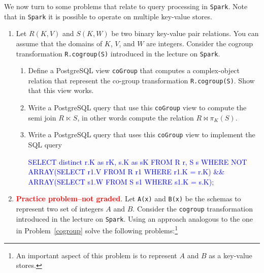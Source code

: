 \documentclass{article}
\renewenvironment{alltt}{\vspace{-0.75\baselineskip}\begin{oldalltt}}{\end{oldalltt}\vspace{+0.50\baselineskip}}
\begin{document}
\newpage
We now turn to some problems that relate to query processing in {\tt Spark}.  Note that in {\tt Spark} it is possible to operate on multiple
key-value stores.
\begin{enumerate}[resume]
\item\label{cogroup} 
Let $R(K,V)$ and $S(K,W)$ be two binary key-value pair relations.
You can assume that the domains of $K$, $V$, and $W$ are integers.
Consider the cogroup transformation {\tt R.cogroup(S)} introduced in the
lecture on {\tt Spark}.  

\begin{enumerate}
\item Define a PostgreSQL view {\tt coGroup} that computes a complex-object relation that represent the co-group transformation {\tt R.cogroup(S)}.
Show that this view works.

\item Write a PostgreSQL query that use this {\tt coGroup} view to compute the semi join
$R\, \ltimes\, S$, in other words compute the relation $R \bowtie \pi_{K}(S)$.

\item Write a PostgreSQL query that uses this {\tt coGroup} view to implement
the SQL query



\begin{alltt}\textcolor{blue}{
 SELECT distinct r.K as rK, s.K as sK
 FROM   R r, S s
 WHERE  NOT ARRAY(SELECT r1.V
                  FROM   R r1
                  WHERE  r1.K = r.K) && ARRAY(SELECT s1.W
                                              FROM	 S s1
                                              WHERE  s1.K = s.K);
}\end{alltt}                                                  

\end{enumerate}


\item \textcolor{red}{\bf Practice problem--not graded}. Let {\tt A(x)} and {\tt B(x)} be the schemas to represent two set of integers $A$ and $B$.
Consider the {\tt cogroup} transformation introduced in the
lecture on {\tt Spark}.
Using an approach analogous to the one in Problem~\ref{cogroup} solve
the following problems:\footnote{An important aspect of this problem is to represent $A$ and $B$ as a key-value stores.}


\end{enumerate}
\end{document}
